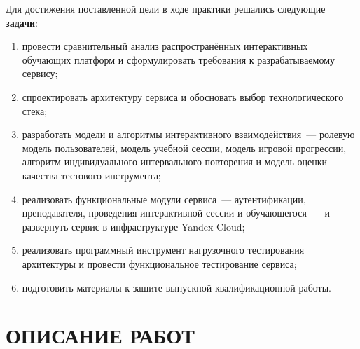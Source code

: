 \documentclass[14pt, a4paper]{extarticle}
\begin{document}
Для достижения поставленной цели в ходе практики решались следующие \textbf{задачи}:
\begin{enumerate}
    \item провести сравнительный анализ распространённых интерактивных обучающих платформ и сформулировать требования к разрабатываемому сервису;
    \item спроектировать архитектуру сервиса и обосновать выбор технологического стека;
    \item разработать модели и алгоритмы интерактивного взаимодействия~--- ролевую модель пользователей, модель учебной сессии, модель игровой прогрессии, алгоритм индивидуального интервального повторения и модель оценки качества тестового инструмента;
    \item реализовать функциональные модули сервиса~--- аутентификации, преподавателя, проведения интерактивной сессии и обучающегося~--- и развернуть сервис в инфраструктуре Yandex Cloud;
    \item реализовать программный инструмент нагрузочного тестирования архитектуры и провести функциональное тестирование сервиса;
    \item подготовить материалы к защите выпускной квалификационной работы.
\end{enumerate}

\newpage

\section*{ОПИСАНИЕ РАБОТ}
\thispagestyle{plain}
\end{document}
